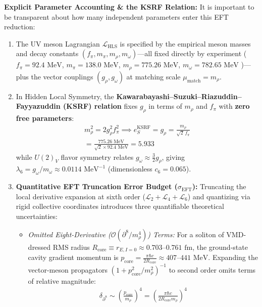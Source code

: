 \documentclass[10pt,aps,prd,twocolumn,superscriptaddress,nofootinbib,floatfix,longbibliography,showkeys]{revtex4-2}
\begin{document}
\textbf{Explicit Parameter Accounting \& the KSRF Relation:}
It is important to be transparent about how many independent parameters enter this EFT reduction:
\begin{enumerate}
  \item The UV meson Lagrangian $\mathcal{L}_{\text{HLS}}$ is specified by the empirical meson masses and decay constants $(f_\pi,\allowbreak m_\pi,\allowbreak m_\rho,\allowbreak m_\omega)$---all fixed directly by experiment ($f_\pi = 92.4\text{ MeV}$, $m_\pi = 138.0\text{ MeV}$, $m_\rho = 775.26\text{ MeV}$, $m_\omega = 782.65\text{ MeV}$ \cite{ref19,ref20})---plus the vector couplings $(g_\rho, g_\omega)$ at matching scale $\mu_{\text{match}} = m_\rho$.
  \item In Hidden Local Symmetry, the \textbf{Kawarabayashi--Suzuki--Riazuddin--Fayyazuddin (KSRF) relation} \cite{ref9,ref10} fixes $g_\rho$ in terms of $m_\rho$ and $f_\pi$ with \textbf{zero free parameters}:
\begin{multline}
m_\rho^2 = 2 g_\rho^2 f_\pi^2 \implies e_S^{\text{KSRF}} = g_\rho = \frac{m_\rho}{\sqrt{2}\,f_\pi} \\
= \frac{775.26\text{ MeV}}{\sqrt{2}\times 92.4\text{ MeV}} = 5.933
\end{multline}
  while $U(2)_V$ flavor symmetry relates $g_\omega \approx \frac{3}{2}g_\rho$, giving $\lambda_6 = g_\omega/m_\omega \approx 0.0114\text{ MeV}^{-1}$ (dimensionless $c_6 = 0.065$).
  \item \textbf{Quantitative EFT Truncation Error Budget ($\sigma_{\text{EFT}}$):} Truncating the local derivative expansion at sixth order ($\mathcal{L}_2 + \mathcal{L}_4 + \mathcal{L}_6$) and quantizing via rigid collective coordinates introduces three quantifiable theoretical uncertainties:
  \begin{itemize}
    \item \textit{Omitted Eight-Derivative ($\mathcal{O}(\partial^8 / m_\rho^4)$) Terms:} For a soliton of VMD-dressed RMS radius $R_{\text{core}} \equiv r_{E,I=0} \approx 0.703\text{--}0.761\text{ fm}$, the ground-state cavity gradient momentum is $p_{\text{core}} = \frac{\pi \hbar c}{2 R_{\text{core}}} \approx 407\text{--}441\text{ MeV}$. Expanding the vector-meson propagators $(1 + p_{\text{core}}^2/m_\rho^2)^{-1}$ to second order omits terms of relative magnitude:
\begin{multline}
\delta_{\partial^8} \sim \left(\frac{p_{\text{core}}}{m_\rho}\right)^4 = \left(\frac{\pi \hbar c}{2 R_{\text{core}} m_\rho}\right)^4 \\

\end{multline}
\end{itemize}
\end{enumerate}
\end{document}
